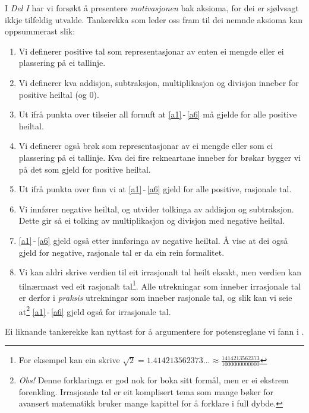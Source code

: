 \newpage
I \textsl{Del I} har vi forsøkt å presentere \textsl{motivasjonen} bak aksioma, for dei er sjølvsagt ikkje tilfeldig utvalde. Tankerekka som leder oss fram til dei nemnde aksioma kan  oppsummerast slik:
\begin{enumerate}
	\item Vi definerer positive tal som representasjonar av enten ei mengde eller ei plassering på ei tallinje.
	\item Vi definerer kva addisjon, subtraksjon, multiplikasjon og divisjon inneber for positive heiltal (og 0).
	\item Ut ifrå punkta over tilseier all fornuft at \eqref{a1}\,-\,\eqref{a6} må gjelde for alle positive heiltal.
	\item Vi definerer også brøk som representasjonar av ei mengde eller som ei plassering på ei tallinje. Kva dei fire rekneartane inneber for brøkar bygger vi på det som gjeld for positive heiltal.
	\item Ut ifrå punkta over finn vi at \eqref{a1}\,-\,\eqref{a6} gjeld for alle positive, rasjonale tal.
	\item Vi innfører negative heiltal, og utvider tolkinga av addisjon og subtraksjon. Dette gir så ei tolking av multiplikasjon og divisjon med negative heiltal.
	\item \eqref{a1}\,-\,\eqref{a6} gjeld også etter innføringa av negative heiltal. Å vise at dei også gjeld for negative, rasjonale tal er da ein rein formalitet.
	\item Vi kan aldri skrive verdien til eit irrasjonalt tal heilt eksakt, men verdien kan tilnærmast ved eit rasjonalt tal\footnote{For eksempel kan ein skrive $ \sqrt{2}=1.414213562373...\approx\frac{1414213562373}{1000000000000} $}. Alle utrekningar som inneber irrasjonale tal er derfor i \textsl{praksis} utrekningar som inneber rasjonale tal, og slik kan vi seie at\footnote{\textit{Obs!} Denne forklaringa er god nok for boka sitt formål, men er ei ekstrem forenkling. Irrasjonale tal er eit komplisert tema som mange bøker for avansert matematikk bruker mange kapittel for å forklare i full dybde.} \eqref{a1}\,-\,\eqref{a6} gjeld også for irrasjonale tal.
\end{enumerate}
Ei liknande tankerekke kan nyttast for å argumentere for potensreglane vi fann i . 



